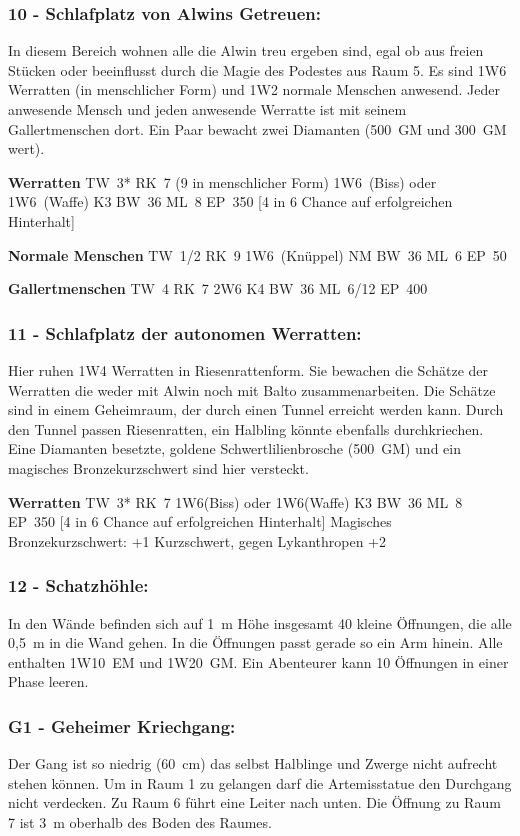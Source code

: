 \subsubsection{10 - Schlafplatz von Alwins Getreuen:} In diesem Bereich wohnen alle die
Alwin treu ergeben sind, egal ob aus freien Stücken oder beeinflusst
durch die Magie des Podestes aus Raum 5. Es sind 1W6 Werratten (in
menschlicher Form) und 1W2 normale Menschen anwesend. Jeder anwesende
Mensch und jeden anwesende Werratte ist mit seinem Gallertmenschen dort.
Ein Paar bewacht zwei Diamanten (500~GM und 300~GM wert).  

\textbf{Werratten} TW~3* RK~7 (9 in menschlicher Form) 1W6~(Biss) oder 1W6~(Waffe)
K3 BW~36 ML~8 EP~350 [4 in 6 Chance auf erfolgreichen Hinterhalt] 

\textbf{Normale Menschen} TW~1/2 RK~9 1W6~(Knüppel) NM BW~36 ML~6 EP~50 

\textbf{Gallertmenschen} TW~4 RK~7 2W6 K4 BW~36 ML~6/12 EP~400

\subsubsection{11 - Schlafplatz der autonomen Werratten:} Hier ruhen 1W4 Werratten in
Riesenrattenform. Sie bewachen die Schätze der Werratten die weder
mit Alwin noch mit Balto zusammenarbeiten. Die Schätze sind in einem
Geheimraum, der durch einen Tunnel erreicht werden kann. Durch den Tunnel
passen Riesenratten, ein Halbling könnte ebenfalls durchkriechen. Eine
Diamanten besetzte, goldene Schwertlilienbrosche (500~GM) und ein
magisches Bronzekurzschwert sind hier versteckt.  

\textbf{Werratten} TW~3* RK~7 1W6(Biss) oder 1W6(Waffe) K3 BW~36 ML~8 EP~350 [4 in 6 Chance auf
erfolgreichen Hinterhalt] Magisches Bronzekurzschwert: +1 Kurzschwert,
gegen Lykanthropen +2

\subsubsection{12 - Schatzhöhle:} In den Wände befinden sich auf 1~m Höhe insgesamt 40
kleine Öffnungen, die alle 0,5~m in die Wand gehen. In die Öffnungen
passt gerade so ein Arm hinein. Alle enthalten 1W10~EM und 1W20~GM. Ein
Abenteurer kann 10 Öffnungen in einer Phase leeren.

\subsubsection{G1 - Geheimer Kriechgang:} Der Gang ist so niedrig (60~cm) das selbst
Halblinge und Zwerge nicht aufrecht stehen können. Um in Raum 1 zu
gelangen darf die Artemisstatue den Durchgang nicht verdecken. Zu Raum
6 führt eine Leiter nach unten. Die Öffnung zu Raum 7 ist 3~m oberhalb
des Boden des Raumes.

